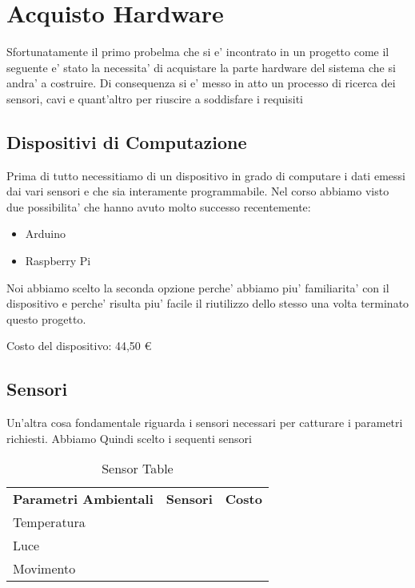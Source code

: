 \section{Acquisto Hardware}

Sfortunatamente il primo probelma che si e' incontrato in un progetto come il seguente e' stato la necessita' di acquistare la parte hardware del sistema che si andra' a costruire. Di consequenza si e' messo in atto un processo di ricerca dei sensori, cavi e quant'altro per riuscire a soddisfare i requisiti

\subsection{Dispositivi di Computazione}

Prima di tutto necessitiamo di un dispositivo in grado di computare i dati emessi dai vari sensori e che sia interamente programmabile. Nel corso abbiamo visto due possibilita' che hanno avuto molto successo recentemente:

\begin{itemize}
  \item Arduino
  \item Raspberry Pi
\end{itemize}

Noi abbiamo scelto la seconda opzione perche' abbiamo piu' familiarita' con il dispositivo e perche' risulta piu' facile il riutilizzo dello stesso una volta terminato questo progetto.

Costo del dispositivo: 44,50 \euro

\subsection{Sensori}

Un'altra cosa fondamentale riguarda i sensori necessari per catturare i parametri richiesti. Abbiamo Quindi scelto i sequenti sensori

\begin{table}[]
\centering
\begin{tabular}{lll}
\cline{1-1}
\multicolumn{1}{|c|}{\textbf{Parametri Ambientali}} & \multicolumn{1}{c}{\textbf{Sensori}} & \multicolumn{1}{c}{\textbf{Costo}} \\ \cline{1-1}
Temperatura                               &                                     &                                   \\
Luce                                      &                                     &                                   \\
Movimento                                 &                                     &                                  
\end{tabular}
\caption{Sensor Table}
\label{Sensor Table}
\end{table}

